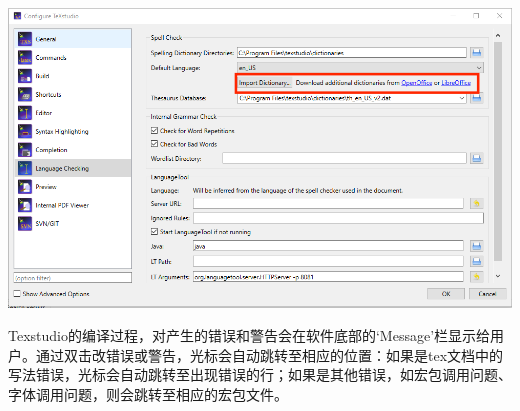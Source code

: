 \documentclass[12pt]{book}
\begin{document}
\begin{center}
     \includegraphics[width=0.8\linewidth]{./lang-check.png}
\end{center}
Texstudio的编译过程，对产生的错误和警告会在软件底部的`Message’栏显示给用户。通过双击改错误或警告，光标会自动跳转至相应的位置：如果是tex文档中的写法错误，光标会自动跳转至出现错误的行；如果是其他错误，如宏包调用问题、字体调用问题，则会跳转至相应的宏包文件。
\end{document}
